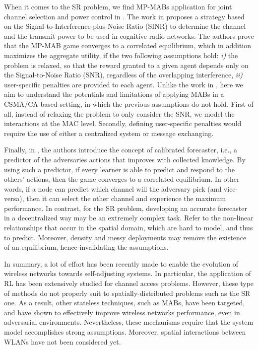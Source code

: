 \documentclass[preprint,12pt]{elsarticle}
\begin{document}
When it comes to the SR problem, we find MP-MABs application for joint channel selection and power control in \cite{maghsudi2015joint, maghsudi2015channel}. The work in \cite{maghsudi2015joint} proposes a strategy based on the Signal-to-Interference-plus-Noise Ratio (SINR) to determine the channel and the transmit power to be used in cognitive radio networks. The authors prove that the MP-MAB game converges to a correlated equilibrium, which in addition maximizes the aggregate utility, if the two following assumptions hold: \emph{i)} the problem is relaxed, so that the reward granted to a given agent depends only on the Signal-to-Noise Ratio (SNR), regardless of the overlapping interference, \emph{ii)} user-specific penalties are provided to each agent. Unlike the work in \cite{maghsudi2015joint}, here we aim to understand the potentials and limitations of applying MABs in a CSMA/CA-based setting, in which the previous assumptions do not hold. First of all, instead of relaxing the problem to only consider the SNR, we model the interactions at the MAC level. Secondly, defining user-specific penalties would require the use of either a centralized system or message exchanging.

Finally, in \cite{maghsudi2015channel}, the authors introduce the concept of calibrated forecaster, i.e., a predictor of the adversaries actions that improves with collected knowledge. By using such a predictor, if every learner is able to predict and respond to the others' actions, then the game converges to a correlated equilibrium. In other words, if a node can predict which channel will the adversary pick (and vice-versa), then it can select the other channel and experience the maximum performance. In contrast, for the SR problem, developing an accurate forecaster in a decentralized way may be an extremely complex task. Refer to the non-linear relationships that occur in the spatial domain, which are hard to model, and thus to predict. Moreover, density and messy deployments may remove the existence of an equilibrium, hence invalidating the assumptions.

In summary, a lot of effort has been recently made to enable the evolution of wireless networks towards self-adjusting systems. In particular, the application of RL has been extensively studied for channel access problems. However, these type of methods do not properly suit to spatially-distributed problems such as the SR one. As a result, other stateless techniques, such as MABs, have been targeted, and have shown to effectively improve wireless networks performance, even in adversarial environments. Nevertheless, these mechanisms require that the system model accomplishes strong assumptions. Moreover, spatial interactions between WLANs have not been considered yet.
\end{document}

